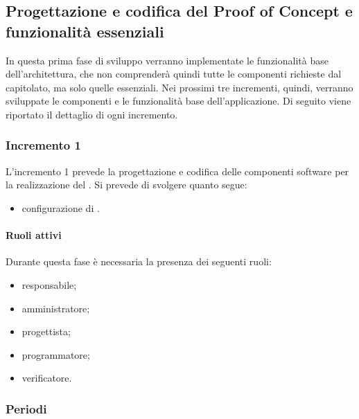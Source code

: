 \newpage %

\subsection{Progettazione e codifica del Proof of Concept e funzionalità essenziali}
In questa prima fase di sviluppo verranno implementate le funzionalità base dell'architettura, che non comprenderà quindi tutte le componenti richieste dal capitolato, ma solo quelle essenziali.
\newline
Nei prossimi tre incrementi, quindi, verranno sviluppate le componenti e le funzionalità base dell'applicazione. \newline
Di seguito viene riportato il dettaglio di ogni incremento.

\subsubsection{Incremento 1}
L'incremento 1 prevede la progettazione e codifica delle componenti software per la realizzazione del . Si prevede di svolgere quanto segue:
\begin{itemize}
	\item configurazione di .
\end{itemize}

\paragraph{Ruoli attivi}

Durante questa fase è necessaria la presenza dei seguenti ruoli: 
\begin{itemize} 
	\item responsabile; 
	\item amministratore; 
	\item progettista; 
	\item programmatore; 
	\item verificatore.
\end{itemize}

\subsubsection{Periodi}

